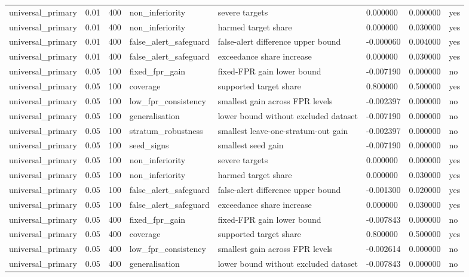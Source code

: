 \begin{tabular}{llllllll}
universal\_primary & 0.01 & 400 & non\_inferiority & severe targets & 0.000000 & 0.000000 & yes \\
universal\_primary & 0.01 & 400 & non\_inferiority & harmed target share & 0.000000 & 0.030000 & yes \\
universal\_primary & 0.01 & 400 & false\_alert\_safeguard & false-alert difference upper bound & -0.000060 & 0.004000 & yes \\
universal\_primary & 0.01 & 400 & false\_alert\_safeguard & exceedance share increase & 0.000000 & 0.030000 & yes \\
universal\_primary & 0.05 & 100 & fixed\_fpr\_gain & fixed-FPR gain lower bound & -0.007190 & 0.000000 & no \\
universal\_primary & 0.05 & 100 & coverage & supported target share & 0.800000 & 0.500000 & yes \\
universal\_primary & 0.05 & 100 & low\_fpr\_consistency & smallest gain across FPR levels & -0.002397 & 0.000000 & no \\
universal\_primary & 0.05 & 100 & generalisation & lower bound without excluded dataset & -0.007190 & 0.000000 & no \\
universal\_primary & 0.05 & 100 & stratum\_robustness & smallest leave-one-stratum-out gain & -0.002397 & 0.000000 & no \\
universal\_primary & 0.05 & 100 & seed\_signs & smallest seed gain & -0.007190 & 0.000000 & no \\
universal\_primary & 0.05 & 100 & non\_inferiority & severe targets & 0.000000 & 0.000000 & yes \\
universal\_primary & 0.05 & 100 & non\_inferiority & harmed target share & 0.000000 & 0.030000 & yes \\
universal\_primary & 0.05 & 100 & false\_alert\_safeguard & false-alert difference upper bound & -0.001300 & 0.020000 & yes \\
universal\_primary & 0.05 & 100 & false\_alert\_safeguard & exceedance share increase & 0.000000 & 0.030000 & yes \\
universal\_primary & 0.05 & 400 & fixed\_fpr\_gain & fixed-FPR gain lower bound & -0.007843 & 0.000000 & no \\
universal\_primary & 0.05 & 400 & coverage & supported target share & 0.800000 & 0.500000 & yes \\
universal\_primary & 0.05 & 400 & low\_fpr\_consistency & smallest gain across FPR levels & -0.002614 & 0.000000 & no \\
universal\_primary & 0.05 & 400 & generalisation & lower bound without excluded dataset & -0.007843 & 0.000000 & no \\

\end{tabular}
